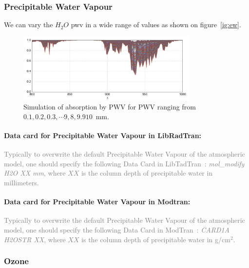 \documentclass[a4paper]{article}
\begin{document}
\subsubsection{Precipitable Water Vapour}


We can vary the $H_2O$ pwv in a wide range of values as shown on figure~\ref{ig:ew}.
\begin{figure}
\centering
\includegraphics[width=0.8\textwidth]{images/pwv}
\caption{\label{fig:ew}Simulation of absorption by PWV for PWV ranging from $0.1, 0.2,0.3, \cdots 9,8,9.910$~mm.}
\end{figure}



\paragraph{Data card for Precipitable Water Vapour in LibRadTran:}

\textcolor{gray}{
Typically to overwrite the default Precipitable Water Vapour of the atmospheric model, one should specify the following Data Card in LibTadTran~:
\textit{mol\_modify  H2O   XX mm}, where $XX$ is the column depth of precipitable water in millimeters.
}


\paragraph{Data card for Precipitable Water Vapour in Modtran:}
\textcolor{gray}{
Typically to overwrite the default Precipitable Water Vapour of the atmospheric model, one should specify the following Data Card in ModTran~:
\textit{CARD1A H2OSTR  XX}, where $XX$ is the column depth of precipitable water in g/cm$^2$.
}

\subsubsection{Ozone}
\end{document}
